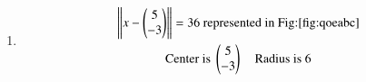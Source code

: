 \begin{enumerate}[label=\thesection.\arabic*.,ref=\thesection.\theenumi]
\begin{enumerate}
\item \begin{multline} 
\left\lVert x - \begin{pmatrix}5\\-3\end{pmatrix}\right\rVert = 36\text{ represented in Fig:\ref{fig:qoeabc}}
\\
\text{Center is }\begin{pmatrix}5\\-3\end{pmatrix}\quad\text{Radius is }6
\end{multline}

\end{enumerate}
\end{enumerate}
